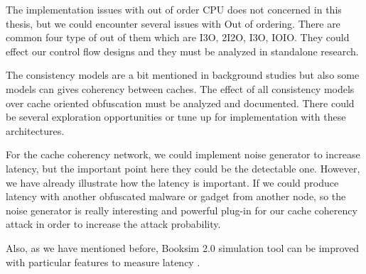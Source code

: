 The implementation issues with out of order CPU does not concerned in this thesis, but we could encounter several issues with Out of ordering. There are common four type of out of them which are I3O, 2I2O,  I3O, IOIO. They could effect our control flow designs and they must be analyzed in standalone research.

The consistency models are a bit mentioned in background studies but also some models can gives coherency between caches. The effect of all consistency models over cache oriented obfuscation must be analyzed and documented. There could be several exploration opportunities or tune up for implementation with these architectures. 

For the cache coherency network, we could implement noise generator to increase latency, but the important point here they could be the detectable one. However, we have already illustrate how the latency is important. If we could produce latency with another obfuscated malware or gadget from another node, so the noise generator is really interesting and powerful plug-in for our cache coherency attack in order to increase the attack probability.

Also, as we have mentioned before, Booksim 2.0 simulation tool can be improved with particular features to measure latency .